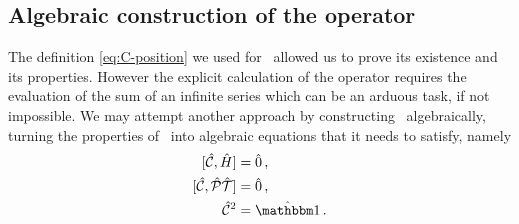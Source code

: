         \subsection{Algebraic construction of the \texorpdfstring{\hC}{C} operator}
            The definition \eqref{eq:C-position} we used for \hC\ allowed us to prove its existence and its properties. However the explicit calculation of the operator requires the evaluation of the sum of an infinite series which can be an arduous task, if not impossible. We may attempt another approach \cite{bender2024} by constructing \hC\ algebraically, turning the properties of \hC\ into algebraic equations that it needs to satisfy, namely
            \begin{align*}
                \comm*{\hC}{\hH}\! &= \hzero 
                \mycomma \\
                \comm*{\hC}{\hPT}\! &= \hzero 
                \mycomma \\
                \hC^2 &= \hidM
                \myperiod
            \end{align*}
            
